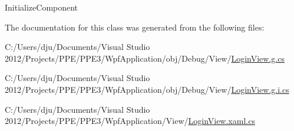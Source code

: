 Initialize\-Component 



The documentation for this class was generated from the following files\-:\begin{DoxyCompactItemize}
\item 
C\-:/\-Users/dju/\-Documents/\-Visual Studio 2012/\-Projects/\-P\-P\-E/\-P\-P\-E3/\-Wpf\-Application/obj/\-Debug/\-View/\hyperlink{_login_view_8g_8cs}{Login\-View.\-g.\-cs}\item 
C\-:/\-Users/dju/\-Documents/\-Visual Studio 2012/\-Projects/\-P\-P\-E/\-P\-P\-E3/\-Wpf\-Application/obj/\-Debug/\-View/\hyperlink{_login_view_8g_8i_8cs}{Login\-View.\-g.\-i.\-cs}\item 
C\-:/\-Users/dju/\-Documents/\-Visual Studio 2012/\-Projects/\-P\-P\-E/\-P\-P\-E3/\-Wpf\-Application/\-View/\hyperlink{_login_view_8xaml_8cs}{Login\-View.\-xaml.\-cs}\end{DoxyCompactItemize}

